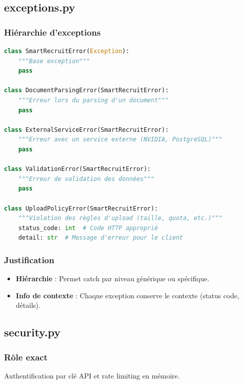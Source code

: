 \documentclass[12pt,a4paper,oneside]{book}
\begin{document}
\subsection{exceptions.py}

\subsubsection{Hiérarchie d'exceptions}

\begin{lstlisting}[language=Python]
class SmartRecruitError(Exception):
    """Base exception"""
    pass

class DocumentParsingError(SmartRecruitError):
    """Erreur lors du parsing d'un document"""
    pass

class ExternalServiceError(SmartRecruitError):
    """Erreur avec un service externe (NVIDIA, PostgreSQL)"""
    pass

class ValidationError(SmartRecruitError):
    """Erreur de validation des données"""
    pass

class UploadPolicyError(SmartRecruitError):
    """Violation des règles d'upload (taille, quota, etc.)"""
    status_code: int  # Code HTTP approprié
    detail: str  # Message d'erreur pour le client
\end{lstlisting}

\subsubsection{Justification}

\begin{itemize}
    \item \textbf{Hiérarchie} : Permet catch par niveau générique ou spécifique.
    
    \item \textbf{Info de contexte} : Chaque exception conserve le contexte (status code, détails).
\end{itemize}

\subsection{security.py}

\subsubsection{Rôle exact}

Authentification par clé API et rate limiting en mémoire.
\end{document}
